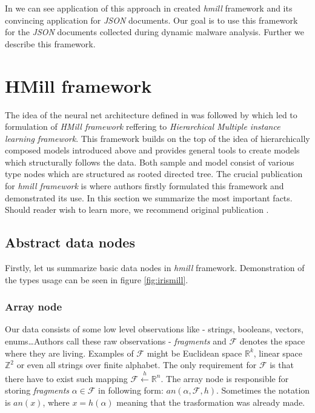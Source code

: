 In \cite{Mandlik2020} we can see application of this approach in created \emph{hmill} framework and its convincing application for \emph{JSON} documents. Our goal is to use this framework for the \emph{JSON} documents collected during dynamic malware analysis. Further we describe this framework.







\section{HMill framework}
The idea of the neural net architecture defined in \cite{Pevny2016a} was followed by \cite{Mandlik2020} which led to formulation of \emph{HMill framework} reffering to \emph{Hierarchical Multiple instance learning framework}. This framework builds on the top of the idea of hierarchically composed models introduced above and provides general tools to create models which structurally follows the data. Both sample and model consist of various type nodes which are structured as rooted directed tree. The crucial publication for \emph{hmill framework} is \cite{Mandlik2020} where authors firstly formulated this framework and demonstrated its use. In this section we summarize the most important facts. Should reader wish to learn more, we recommend original publication \cite{Mandlik2020}.

\subsection{Abstract data nodes}
Firstly, let us summarize basic data nodes in \emph{hmill} framework. Demonstration of the types usage can be seen in figure \ref{fig:irismill}.
\subsubsection{Array node}
Our data consists of some low level observations like - strings, booleans, vectors, enums\dots Authors call these raw observations - \emph{fragments} and $\mathcal{F}$ denotes the space where they are living. Examples of $\mathcal{F}$ might be Euclidean space $\mathbb{R}^{k}$, linear space $\mathbb{Z}^{2}$ or even all strings over finite alphabet. The only requirement for $\mathcal{F}$ is that there have to exist such mapping $\mathcal{F}\xleftarrow{h}\mathbb{R}^{n}$. The array node is responsible for storing \emph{fragments} $\alpha\in\mathcal{F}$ in following form: $an(\alpha,\mathcal{F},h)$. Sometimes the notation is $an(x)$, where $x=h(\alpha)$ meaning that the trasformation was already made.


